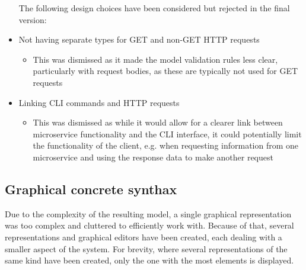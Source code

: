 \documentclass[parskip=full]{article}
\begin{document}
\begin{itemize}
        The following design choices have been considered but rejected in the final version:
        \item	Not having separate types for GET and non-GET HTTP requests
        \begin{itemize}
            \item This was dismissed as it made the model validation rules less clear, particularly with request bodies, as these are typically not used for GET requests
        \end{itemize}
        \item	Linking CLI commands and HTTP requests
        \begin{itemize}
            \item This was dismissed as while it would allow for a clearer link between microservice functionality and the CLI interface, it could potentially limit the functionality of the client, e.g. when requesting information from one microservice and using the response data to make another request
        \end{itemize}
    \end{itemize}
    \pagebreak
    \subsection{Graphical concrete synthax}
    Due to the complexity of the resulting model, a single graphical representation was too complex and cluttered to efficiently work with.
    Because of that, several representations and graphical editors have been created, each dealing with a smaller aspect of the system.
    For brevity, where several representations of the same kind have been created, only the one with the most elements is displayed.
\end{document}
